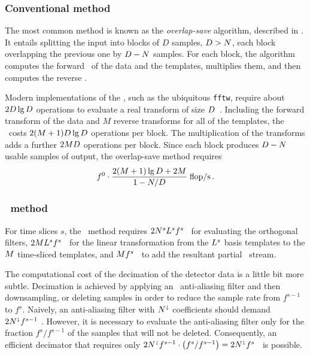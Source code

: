 \subsubsection{Conventional \FD{} method}

The most common \FD{} method is known as the \emph{overlap-save} algorithm, described in \cite{numerical-recipes-chapter-13}.  It entails splitting the input into blocks of $D$ samples, $D > N$, each block overlapping the previous one by $D - N$ samples.  For each block, the algorithm computes the forward \fft\ of the data and the templates, multiplies them, and then computes the reverse \fft.

Modern implementations of the \fft, such as the ubiquitous \texttt{fftw}, require about $2 D \lg D$ operations to evaluate a real transform of size $D$~\cite{Johnson:2007p9654}.  Including the forward transform of the data and $M$ reverse transforms for all of the templates, the \fft\ costs $2 (M + 1) D \lg D$ operations per block.  The multiplication of the transforms adds a further $2 M D$ operations per block.  Since each block produces $D - N$ usable samples of output, the overlap-save method requires
$$
f^0 \cdot \frac{2 (M + 1) \lg D + 2 M}{1 - N/D} \; \mathrm{flop/s} \,.
$$

\subsubsection{\lloid\ method}

For time slices $s$, the \lloid\ method requires $2 N^s L^s f^s$ \flops\ 
for evaluating the orthogonal filters, $2 M L^s f^s$ \flops\ for the 
linear transformation from the $L^s$ basis templates to the $M$ time-sliced templates, and $M f^s$ \flops\ to add the resultant partial \SNR\ stream.

The computational cost of the decimation of the detector data is a little bit more subtle.  Decimation is achieved by applying an \fir\ anti-aliasing filter and then downsampling, or deleting samples in order to reduce the sample rate from $f^{s-1}$ to $f^s$.  Naively, an anti-aliasing filter with $N^\shortdownarrow$ coefficients should demand $2 N^\shortdownarrow f^{s-1}$ \flops.  However, it is necessary to evaluate the anti-aliasing filter only for the fraction $f^s / f^{s-1}$ of the samples that will not be deleted.  Consequently, an efficient decimator that requires only $2 N^\shortdownarrow f^{s-1} \cdot \left( f^s / f^{s-1} \right) = 2 N^\shortdownarrow f^s$ \flops\ is possible.

